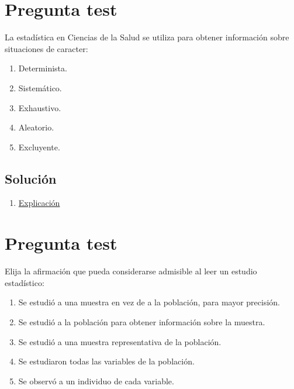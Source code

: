 \documentclass[
]{book}
\providecommand{\tightlist}{%
  \setlength{\itemsep}{0pt}\setlength{\parskip}{0pt}}
\begin{document}
\hypertarget{pregunta-test-5}{%
\section{Pregunta test}\label{pregunta-test-5}}

La estadística en Ciencias de la Salud se utiliza para obtener información sobre situaciones de caracter:

\begin{enumerate}
\def\labelenumi{\alph{enumi})}
\tightlist
\item
  Determinista.
\item
  Sistemático.
\item
  Exhaustivo.
\item
  Aleatorio.
\item
  Excluyente.
\end{enumerate}

\hypertarget{soluciuxf3n-5}{%
\subsection{Solución}\label{soluciuxf3n-5}}

\begin{enumerate}
\def\labelenumi{\alph{enumi})}
\setcounter{enumi}{3}
\tightlist
\item
  \href{https://1fjmanzano.github.io/bioestadistica/inferencia-estad\%C3\%ADstica.html}{Explicación}
\end{enumerate}

\hypertarget{pregunta-test-6}{%
\section{Pregunta test}\label{pregunta-test-6}}

Elija la afirmación que pueda considerarse admisible al leer un estudio estadístico:

\begin{enumerate}
\def\labelenumi{\alph{enumi})}
\tightlist
\item
  Se estudió a una muestra en vez de a la población, para mayor precisión.
\item
  Se estudió a la población para obtener información sobre la muestra.
\item
  Se estudió a una muestra representativa de la población.
\item
  Se estudiaron todas las variables de la población.
\item
  Se observó a un individuo de cada variable.
\end{enumerate}
\end{document}
